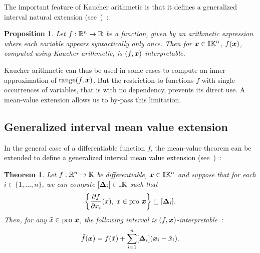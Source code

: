 \documentclass{sig-alternate-05-2015} %
\newtheorem{theorem}{Theorem}
\newtheorem{proposition}{Proposition}
\DeclareMathOperator{\range}{range}
\newcommand{\pro}{\mbox{pro }}
\def\bbr{{\Bbb R}}
\def\I{{\Bbb I \Bbb R}}
\def\K{{\Bbb I \Bbb K}}
\begin{document}
The important feature of Kaucher arithmetic is that it defines a generalized interval natural extension (see~\cite{gold1})~:
\begin{proposition}
\label{prop1}
Let $f : \bbr^n \rightarrow \bbr$ be a function, given by an arithmetic expression where each variable appears syntactically only once.
Then for $\x \in \K^n$, $f(\x)$, computed using Kaucher arithmetic, is $(f,\x)$-interpretable.
\end{proposition}
Kaucher arithmetic can thus be used in some cases to compute an inner-approximation of $\range(f,\x)$.
But the restriction to functions $f$ with single occurrences of variables, 
that is with no dependency, prevents its direct use. A mean-value extension allows us to by-pass this limitation.

\subsection{Generalized interval mean value extension}
\label{generalizedmean}
In the general case of a differentiable function $f$, the mean-value theorem can be extended to define 
a generalized interval mean value extension (see~\cite{gold1})~:
\begin{theorem}
\label{thm1}
Let $f : \bbr^n \rightarrow \bbr$ be differentiable, $\x \in \K^n$ and suppose that for each $i \in \{1,\ldots,n\}$, we can compute $[\bfm{\Delta}_i] \in \I$ such that 
\begin{equation} 
\left\{ \frac{\partial f}{\partial x_i} (x), \; x \in \pro \x \right\} 
\sqsubseteq [\bfm{\Delta}_i].
\label{delta1} 
\end{equation}
Then, for any $\tilde x \in \pro \x$, the following interval is $(f,\x)$-interpretable~:
\begin{equation}
\tilde{f}(\x) = f(\tilde x) + \sum\limits_{i=1}^{n} [\bfm{\Delta}_i] (\x_i - \tilde{x}_i).
\label{Taylor}
\end{equation}
\end{theorem}
\end{document}
